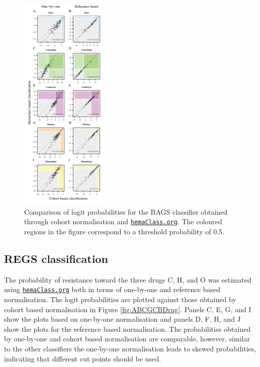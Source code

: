 \documentclass{article}
\newcommand{\hemaClass}{\href{http://hemaClass.org}{\texttt{hemaClass.org}}}
\begin{document}
\begin{figure}
\begin{center}
\includegraphics[width=0.375\textwidth]{BAGSlogitChep.pdf}
\end{center}
\caption{Comparison of logit probabilities for the BAGS classifier obtained through cohort normalisation and \hemaClass{}.
The coloured regions in the figure correspond to a threshold probability of 0.5.}
\label{fig:Bagscorr}
\end{figure}
\newpage


\subsection{REGS classification}

The probability of resistance toward the three drugs C, H, and O was estimated using \hemaClass{} both in terms of one-by-one and reference based normalisation.
The logit probabilities are plotted against those obtained by cohort based normalisation in Figure \ref{fig:ABCGCBDrug}.
Panels C, E, G, and I show the plots based on one-by-one normalisation and panels D, F, H, and J show the plots for the reference based normalisation.
The probabilities obtained by one-by-one and cohort based normalisation are comparable, however, similar to the other classifiers the one-by-one normalisation leads to skewed probabilities, indicating that different cut points should be used.
\end{document}
